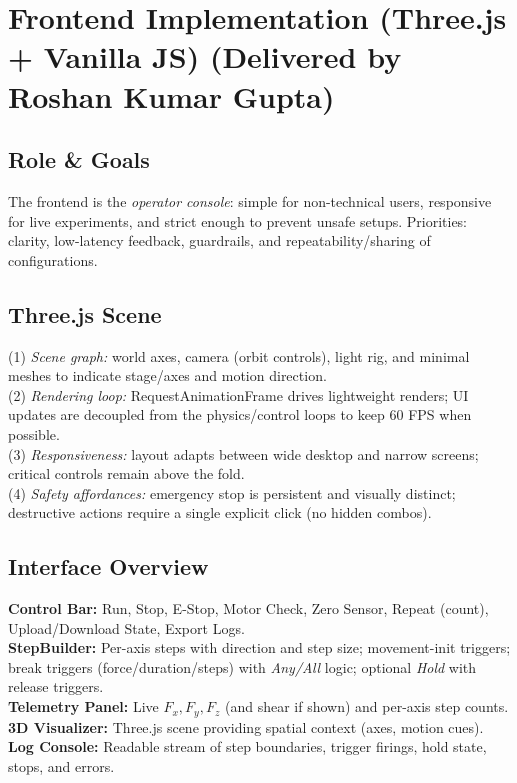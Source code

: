 \documentclass[
    twocolumn,
    fontsize = 10pt,
    parskip = half+,
    headings = small,
    headwidth = text,
    footwidth = text,
]{scrartcl}
\begin{document}
\section{Frontend Implementation (Three.js + Vanilla JS) \textnormal{(Delivered by Roshan Kumar Gupta)}}
\label{sec:frontend}

\subsection{Role \& Goals}
The frontend is the \emph{operator console}: simple for non-technical users, responsive for live experiments, and strict enough to prevent unsafe setups. Priorities: clarity, low-latency feedback, guardrails, and repeatability/sharing of configurations.

\subsection{Three.js Scene}
(1) \emph{Scene graph:} world axes, camera (orbit controls), light rig, and minimal meshes to indicate stage/axes and motion direction.\\

(2) \emph{Rendering loop:} RequestAnimationFrame drives lightweight renders; UI updates are decoupled from the physics/control loops to keep 60 FPS when possible.\\

(3) \emph{Responsiveness:} layout adapts between wide desktop and narrow screens; critical controls remain above the fold.\\

(4) \emph{Safety affordances:} emergency stop is persistent and visually distinct; destructive actions require a single explicit click (no hidden combos).\\


\subsection{Interface Overview}
\textbf{Control Bar:} Run, Stop, E-Stop, Motor Check, Zero Sensor, Repeat (count), Upload/Download State, Export Logs.\\
\textbf{StepBuilder:} Per-axis steps with direction and step size; movement-init triggers; break triggers (force/duration/steps) with \emph{Any/All} logic; optional \emph{Hold} with release triggers.\\
\textbf{Telemetry Panel:} Live $F_x, F_y, F_z$ (and shear if shown) and per-axis step counts.\\
\textbf{3D Visualizer:} Three.js scene providing spatial context (axes, motion cues).\\
\textbf{Log Console:} Readable stream of step boundaries, trigger firings, hold state, stops, and errors.
\end{document}
